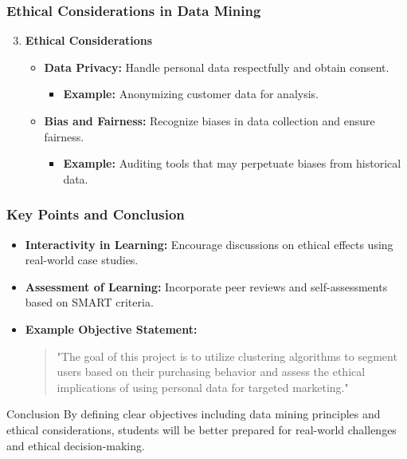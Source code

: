 \documentclass[aspectratio=169]{beamer}
\begin{document}
\begin{frame}[fragile]
    \frametitle{Ethical Considerations in Data Mining}
    \begin{enumerate}
        \setcounter{enumi}{2}
        \item \textbf{Ethical Considerations}
            \begin{itemize}
                \item \textbf{Data Privacy:} Handle personal data respectfully and obtain consent.
                    \begin{itemize}
                        \item \textbf{Example:} Anonymizing customer data for analysis.
                    \end{itemize}
                \item \textbf{Bias and Fairness:} Recognize biases in data collection and ensure fairness.
                    \begin{itemize}
                        \item \textbf{Example:} Auditing tools that may perpetuate biases from historical data.
                    \end{itemize}
            \end{itemize}
    \end{enumerate}
\end{frame}

\begin{frame}[fragile]
    \frametitle{Key Points and Conclusion}
    \begin{itemize}
        \item \textbf{Interactivity in Learning:} Encourage discussions on ethical effects using real-world case studies.
        \item \textbf{Assessment of Learning:} Incorporate peer reviews and self-assessments based on SMART criteria.
        \item \textbf{Example Objective Statement:} 
            \begin{quote}
            "The goal of this project is to utilize clustering algorithms to segment users based on their purchasing behavior and assess the ethical implications of using personal data for targeted marketing."
            \end{quote}
    \end{itemize}
    \begin{block}{Conclusion}
        By defining clear objectives including data mining principles and ethical considerations, students will be better prepared for real-world challenges and ethical decision-making.
    \end{block}
\end{frame}
\end{document}

